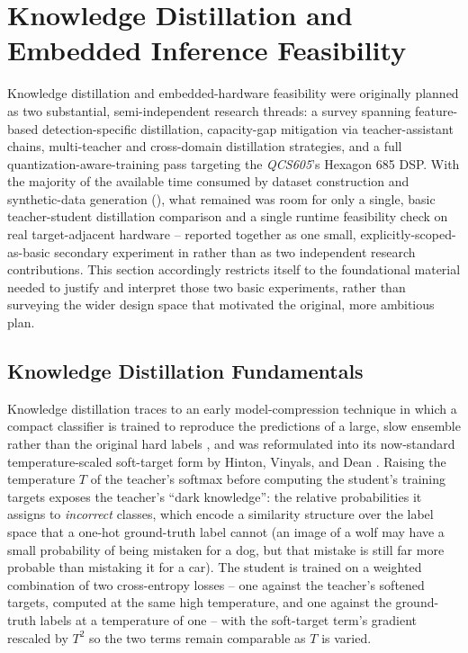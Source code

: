 \section{Knowledge Distillation and Embedded Inference Feasibility}\label{sec:lit_kd_and_embedded}

Knowledge distillation and embedded-hardware feasibility were originally planned as two substantial, semi-independent research threads: a survey spanning feature-based detection-specific distillation, capacity-gap mitigation via teacher-assistant chains, multi-teacher and cross-domain distillation strategies, and a full quantization-aware-training pass targeting the \textit{QCS605}'s Hexagon 685 DSP. With the majority of the available time consumed by dataset construction and synthetic-data generation (), what remained was room for only a single, basic teacher-student distillation comparison and a single runtime feasibility check on real target-adjacent hardware -- reported together as one small, explicitly-scoped-as-basic secondary experiment in  rather than as two independent research contributions. This section accordingly restricts itself to the foundational material needed to justify and interpret those two basic experiments, rather than surveying the wider design space that motivated the original, more ambitious plan.

\subsection{Knowledge Distillation Fundamentals}\label{sec:lit_knowledge_distillation}

Knowledge distillation traces to an early model-compression technique in which a compact classifier is trained to reproduce the predictions of a large, slow ensemble rather than the original hard labels \cite{buciluaModelCompression2006}, and was reformulated into its now-standard temperature-scaled soft-target form by Hinton, Vinyals, and Dean \cite{hintonDistillingKnowledgeNeural2015}. Raising the temperature $T$ of the teacher's softmax before computing the student's training targets exposes the teacher's \enquote{dark knowledge}: the relative probabilities it assigns to \emph{incorrect} classes, which encode a similarity structure over the label space that a one-hot ground-truth label cannot (an image of a wolf may have a small probability of being mistaken for a dog, but that mistake is still far more probable than mistaking it for a car). The student is trained on a weighted combination of two cross-entropy losses -- one against the teacher's softened targets, computed at the same high temperature, and one against the ground-truth labels at a temperature of one -- with the soft-target term's gradient rescaled by $T^2$ so the two terms remain comparable as $T$ is varied.

